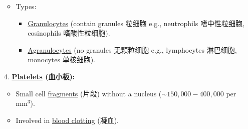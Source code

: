\begin{itemize}
\begin{itemize}
        \item Types:
        \begin{itemize}
            \item \underline{Granulocytes} (contain granules 粒细胞 e.g., neutrophils 嗜中性粒细胞, eosinophils 嗜酸性粒细胞).
            \item \underline{Agranulocytes} (no granules 无颗粒细胞 e.g., lymphocytes 淋巴细胞, monocytes 单核细胞).
        \end{itemize}
    \end{itemize}
    \item[4.] \textbf{\underline{Platelets} (血小板):}
    \begin{itemize}
        \item Small cell \underline{fragments} (片段) without a nucleus ($\sim 150,000-400,000$ per $\text{mm}^3$).
        \item Involved in \underline{blood clotting} (凝血).
    \end{itemize}
\end{itemize}

